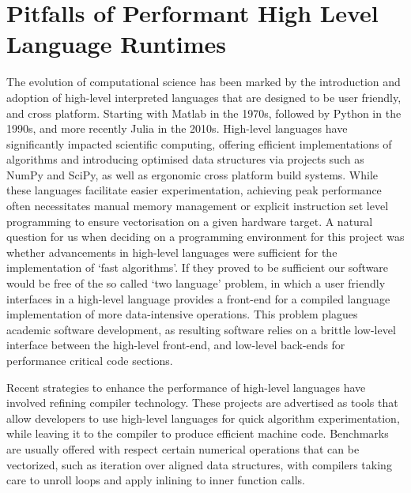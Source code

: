 \section{Pitfalls of Performant High Level Language Runtimes}\label{chpt:1:sec:1}

The evolution of computational science has been marked by the introduction and adoption of high-level interpreted languages that are designed to be user friendly, and cross platform. Starting with Matlab in the 1970s, followed by Python in the 1990s, and more recently Julia in the 2010s. High-level languages have significantly impacted scientific computing, offering efficient implementations of algorithms and introducing optimised data structures via projects such as NumPy and SciPy, as well as ergonomic cross platform build systems. While these languages facilitate easier experimentation, achieving peak performance often necessitates manual memory management or explicit instruction set level programming to ensure vectorisation on a given hardware target. A natural question for us when deciding on a programming environment for this project was whether advancements in high-level languages were sufficient for the implementation of `fast algorithms'. If they proved to be sufficient our software would be free of the so called `two language' problem, in which a user friendly interfaces in a high-level language provides a front-end for a compiled language implementation of more data-intensive operations. This problem plagues academic software development, as resulting software relies on a brittle low-level interface between the high-level front-end, and low-level back-ends for performance critical code sections.

Recent strategies to enhance the performance of high-level languages have involved refining compiler technology. These projects are advertised as tools that allow developers to use high-level languages for quick algorithm experimentation, while leaving it to the compiler to produce efficient machine code. Benchmarks are usually offered with respect certain numerical operations that can be vectorized, such as iteration over aligned data structures, with compilers taking care to unroll loops and apply inlining to inner function calls.


